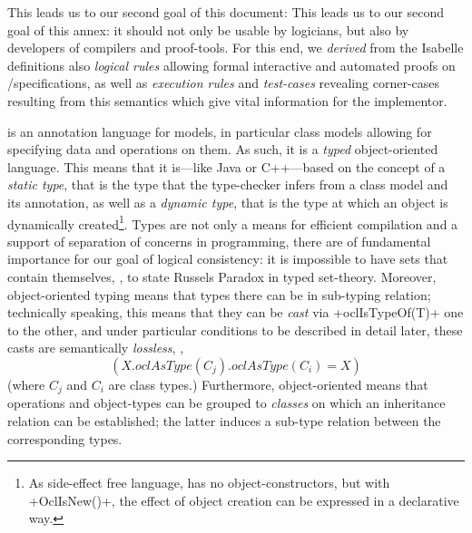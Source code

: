 \isatagafp
 This leads us to our second goal of this document:
\endisatagafp
\isatagannexa
 This leads us to our second goal of this annex:
\endisatagannexa
it should not only be
usable by logicians, but also by developers of compilers and
proof-tools. For this end, we \emph{derived} from the Isabelle
definitions also \emph{logical rules} allowing formal interactive and
automated proofs on \UML/\OCL specifications, as well as
\emph{execution rules} and \emph{test-cases} revealing corner-cases
resulting from this semantics which give vital information for the
implementor.

\OCL is an annotation language for \UML models, in particular class
models allowing for specifying data and operations on them. As such,
it is a \emph{typed} object-oriented language. This means that it
is---like Java or C++---based on the concept of a \emph{static type},
that is the type that the type-checker infers from a \UML class model
and its \OCL annotation, as well as a \emph{dynamic type}, that is the
type at which an object is dynamically created\footnote{As
  side-effect free language, \OCL has no object-constructors, but with
  \inlineocl+OclIsNew()+, the effect of object creation can be
  expressed in a declarative way.}. Types are not only a means for
efficient compilation and a support of separation of concerns in
programming, there are of fundamental importance for our goal of
logical consistency: it is impossible to have sets that contain
themselves, \ie, to state Russels Paradox in \OCL typed set-theory.
Moreover, object-oriented typing means that types there can be in
sub-typing relation; technically speaking, this means that they can be
\emph{cast} via \inlineocl+oclIsTypeOf(T)+ one to the other, and under
particular conditions to be described in detail later, these casts are
semantically \emph{lossless}, \ie,
\begin{equation}
 (X.oclAsType(C_j).oclAsType(C_i) = X)
\end{equation}
(where $C_j$ and $C_i$ are class types.)
Furthermore, object-oriented means that operations and object-types can be
grouped to \emph{classes} on which an inheritance relation can be established;
the latter induces a sub-type relation between the corresponding types.

